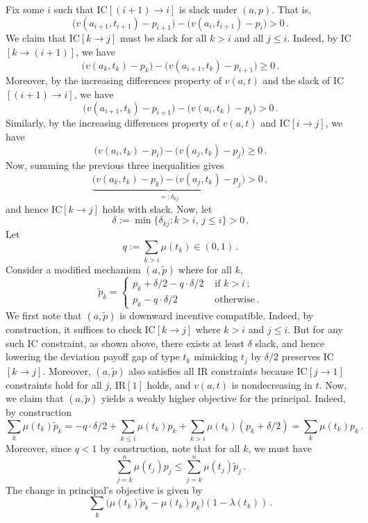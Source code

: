 \documentclass[12pt,letterpaper]{article}
\newenvironment{original}{\color{black}\noindent}{}
\theoremstyle{plain}
\theoremstyle{definition}
\theoremstyle{remark}
\renewcommand{\1}{\mathds{1}}
\theoremstyle{definition}
\begin{document}
\begin{original}
Fix some $i$ such that IC$[(i+1) \rightarrow i]$ is slack under $(a, p)$. That is,
\[\big(v(a_{i+1}, t_{i+1}) - p_{i+1}\big) - \big(v(a_{i}, t_{i+1}) - p_{i}\big) > 0\,.\]
We claim that IC$[k \rightarrow j]$ must be slack for all $k > i$ and all $j \leq i$. Indeed, by  IC$[k \rightarrow (i+1)]$, we have
\[\big(v(a_{k}, t_{k}) - p_{k}\big) - \big(v(a_{i+1}, t_{k}) - p_{i+1}\big) \geq 0\,.\]
Moreover, by the increasing differences property of $v(a, t)$ and the slack of IC$[(i+1) \rightarrow i]$, we have
\[\big(v(a_{i+1}, t_{k}) - p_{i+1}\big) - \big(v(a_{i}, t_{k}) - p_{i}\big) > 0\,.\]
Similarly, by the increasing differences property of $v(a, t)$ and IC$[i \rightarrow j]$, we have
\[\big(v(a_{i}, t_{k}) - p_{i}\big) - \big(v(a_{j}, t_{k}) - p_{j}\big) \geq 0\,.\]
Now, summing the previous three inequalities gives
\[\underbrace{\big(v(a_{k}, t_{k}) - p_{k}\big) - \big(v(a_{j}, t_{k}) - p_{j}\big)}_{=: \delta_{kj}} > 0\,, \]
and hence IC$[k \rightarrow j]$ holds with slack. Now, let
\[\delta := \min\big\{\delta_{kj}: k > i,\, j \leq i\big\} > 0\,.\]
Let
\[q := \sum_{k > i} \mu(t_k) \in (0, 1)\,. \]
Consider a modified mechanism $(a, \tilde{p})$ where for all $k$,
\[
    \tilde{p}_k =
\begin{cases}
 p_k + \delta/2 - q \cdot \delta/2 & \text{ if $k > i$}\,;\\
 p_k - q \cdot \delta/2 & \text{ otherwise}\,.
\end{cases}
\]
We first note that $(a, \tilde{p})$ is downward incentive compatible. Indeed, by construction, it suffices to check IC$[k \rightarrow j]$ where $k > i$ and $j \leq i$. But for any such IC constraint, as shown above, there exists at least $\delta$ slack, and hence lowering the deviation payoff gap of type $t_k$ mimicking $t_{j}$ by $\delta/2$ preserves IC$[k \rightarrow j]$.  Moreover, $(a, \tilde{p})$  also satisfies all IR constraints because IC$[j \rightarrow 1]$ constraints hold for all $j$, IR$[1]$ holds, and $v(a, t)$ is nondecreasing in $t$. Now, we claim that $(a, \tilde{p})$ yields a weakly higher objective for the principal. Indeed, by construction
\[\sum_k \mu(t_k) \tilde{p}_k  =  - q \cdot \delta/2 + \sum_{k \leq i} \mu(t_k) p_k + \sum_{k > i}\mu(t_k) (p_k + \delta/2) = \sum_k \mu(t_k) p_k\,. \]
Moreover, since $q < 1$ by construction, note that for all $k$, we must have
\[\sum_{j=k}^n \mu(t_j) p_j \leq \sum_{j=k}^n \mu(t_j) \tilde{p}_j \,.\]
The change in principal's objective is given by
\[\sum_k \Big(\mu(t_k)\tilde{p}_k  - \mu(t_k)p_k\Big) (1 - \lambda(t_k))\,.\]

\end{original}
\end{document}
